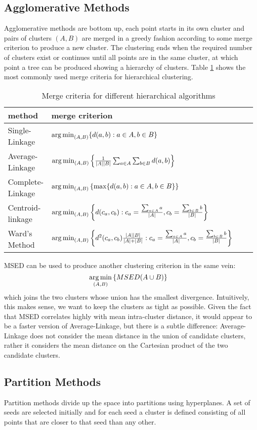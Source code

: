 \subsection{Agglomerative Methods}
Agglomerative methods are bottom up, each point starts in its own cluster and pairs of clusters $(A, B)$ are merged in a greedy fashion according to some merge criterion to produce a new cluster.  The clustering ends when the required number of clusters exist or continues until all points are in the same cluster, at which point a tree can be produced showing a hierarchy of clusters.  Table \ref{tab:merge} shows the most commonly used merge criteria for hierarchical clustering.
\begin{table}
\caption{Merge criteria for different hierarchical algorithms}\label{tab:merge}
\begin{tabularx}{\textwidth}{Xlll}
\hline
method & merge criterion\\
\hline
Single-Linkage & $\operatorname*{arg\,min}_{(A, B)}\{ d(a, b) : a \in A, b \in B \}$\\
Average-Linkage & $\operatorname*{arg\,min}_{(A, B)}\left\lbrace\frac{1}{|A||B|} \sum_{a \in A}\sum_{b \in B} d(a, b)\right\rbrace$\\
Complete-Linkage & $\operatorname*{arg\,min}_{(A, B)}\left\lbrace\max\{ d(a, b) : a \in A, b \in B \}\right\rbrace$\\
Centroid-linkage & $\operatorname*{arg\,min}_{(A, B)}\left\lbrace d(c_a, c_b) : c_a =  \frac{\sum_{a \in A} a}{|A|}, c_b =  \frac{\sum_{b \in B} b}{|B|}\right\rbrace$\\
Ward's Method & $\operatorname*{arg\,min}_{(A, B)}\left\lbrace d^2(c_a, c_b)\frac{|A||B|}{|A| +|B|} : c_a =  \frac{\sum_{a \in A} a}{|A|}, c_b =  \frac{\sum_{b \in B} b}{|B|}\right\rbrace$\\
\hline
\end{tabularx}
\end{table}

MSED can be used to produce another clustering criterion in the same vein:
\[
\operatorname*{arg\,min}_{(A, B)} \left\lbrace MSED(A \cup B) \right\rbrace
\]
which joins the two clusters whose union has the smallest divergence.  Intuitively, this makes sense, we want to keep the clusters as tight as possible.  Given the fact that MSED correlates highly with mean intra-cluster distance, it would appear to be a faster version of Average-Linkage, but there is a subtle difference: Average-Linkage does not consider the mean distance in the union of candidate clusters, rather it considers the mean distance on the Cartesian product of the two candidate clusters.
\subsection{Partition Methods}
Partition methods divide up the space into partitions using hyperplanes.  A set of seeds are selected initially and for each seed a cluster is defined consisting of all points that are closer to that seed than any other.

